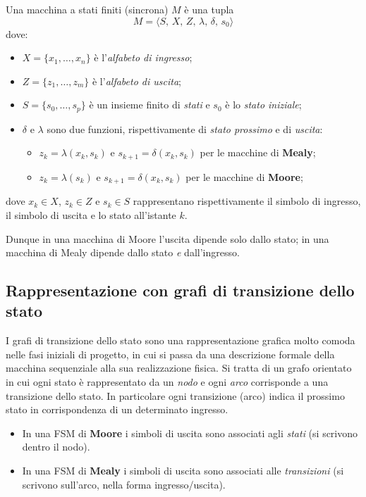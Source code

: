 \documentclass[11pt,a4paper]{article}
\begin{document}
\begin{definizione}
Una macchina a stati finiti (sincrona) $M$ è una tupla
\[
M = \langle S,\, X,\, Z,\, \lambda,\, \delta,\, s_0\rangle
\]
dove:
\begin{itemize}
    \item $X = \{x_1, \dots, x_n\}$ è l'\emph{alfabeto di ingresso};
    \item $Z = \{z_1, \dots, z_m\}$ è l'\emph{alfabeto di uscita};
    \item $S = \{s_0, \dots, s_p\}$ è un insieme finito di \emph{stati} e $s_0$ è lo \emph{stato iniziale};
    \item $\delta$ e $\lambda$ sono due funzioni, rispettivamente di \emph{stato prossimo} e di \emph{uscita}:
    \begin{itemize}
        \item $z_k = \lambda(x_k, s_k)$ e $s_{k+1} = \delta(x_k, s_k)$ per le macchine di \textbf{Mealy};
        \item $z_k = \lambda(s_k)$ e $s_{k+1} = \delta(x_k, s_k)$ per le macchine di \textbf{Moore};
    \end{itemize}
\end{itemize}
dove $x_k \in X$, $z_k \in Z$ e $s_k \in S$ rappresentano rispettivamente il simbolo di ingresso, il simbolo di uscita e lo stato all'istante $k$.
\end{definizione}

Dunque in una macchina di Moore l'uscita dipende solo dallo stato; in una macchina di Mealy dipende dallo stato \emph{e} dall'ingresso.

\subsection{Rappresentazione con grafi di transizione dello stato}

I grafi di transizione dello stato sono una rappresentazione grafica molto comoda nelle fasi iniziali di progetto, in cui si passa da una descrizione formale della macchina sequenziale alla sua realizzazione fisica. Si tratta di un grafo orientato in cui ogni stato è rappresentato da un \emph{nodo} e ogni \emph{arco} corrisponde a una transizione dello stato. In particolare ogni transizione (arco) indica il prossimo stato in corrispondenza di un determinato ingresso.
\begin{itemize}
    \item In una FSM di \textbf{Moore} i simboli di uscita sono associati agli \emph{stati} (si scrivono dentro il nodo).
    \item In una FSM di \textbf{Mealy} i simboli di uscita sono associati alle \emph{transizioni} (si scrivono sull'arco, nella forma ingresso/uscita).
\end{itemize}
\end{document}
